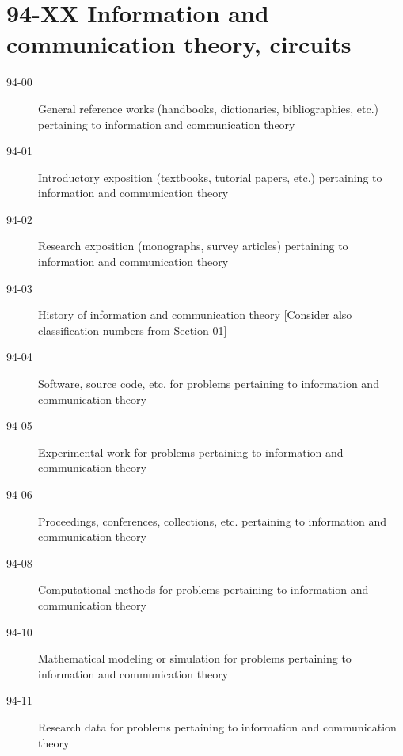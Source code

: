 \section*{94-XX Information and communication theory, circuits }\label{94-XX}
\begin{description}
\item [94-00]\label{94-00} General reference works (handbooks, dictionaries, bibliographies, etc.) pertaining to information and communication theory
\item [94-01]\label{94-01} Introductory exposition (textbooks, tutorial papers, etc.) pertaining to information and communication theory
\item [94-02]\label{94-02} Research exposition (monographs, survey articles) pertaining to information and communication theory
\item [94-03]\label{94-03} History of information and communication theory [Consider also classification numbers from Section \hyperref[01-XX]{01}]
\item [94-04]\label{94-04} Software, source code, etc. for problems pertaining to information and communication theory
\item [94-05]\label{94-05} Experimental work for problems pertaining to information and communication theory
\item [94-06]\label{94-06} Proceedings, conferences, collections, etc. pertaining to information and communication theory
\item [94-08]\label{94-08} Computational methods for problems pertaining to information and communication theory
\item [94-10]\label{94-10} Mathematical modeling or simulation for problems pertaining to information and communication theory
\item [94-11]\label{94-11} Research data for problems pertaining to information and communication theory
\end{description}
